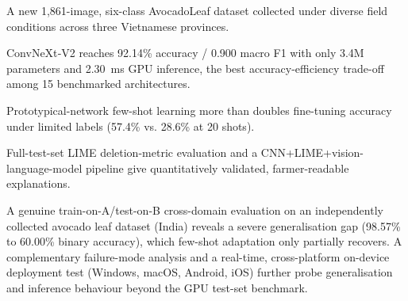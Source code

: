 \begin{highlights}
\item A new 1,861-image, six-class AvocadoLeaf dataset collected under diverse field conditions across three Vietnamese provinces.
\item ConvNeXt‑V2 reaches 92.14\% accuracy / 0.900 macro F1 with only 3.4M parameters and 2.30~ms GPU inference, the best accuracy-efficiency trade-off among 15 benchmarked architectures.
\item Prototypical-network few-shot learning more than doubles fine-tuning accuracy under limited labels (57.4\% vs. 28.6\% at 20 shots).
\item Full-test-set LIME deletion-metric evaluation and a CNN+LIME+vision-language-model pipeline give quantitatively validated, farmer-readable explanations.
\item A genuine train-on-A/test-on-B cross-domain evaluation on an independently collected avocado leaf dataset (India) reveals a severe generalisation gap (98.57\% to 60.00\% binary accuracy), which few-shot adaptation only partially recovers. A complementary failure-mode analysis and a real-time, cross-platform on-device deployment test (Windows, macOS, Android, iOS) further probe generalisation and inference behaviour beyond the GPU test-set benchmark.
\end{highlights}

